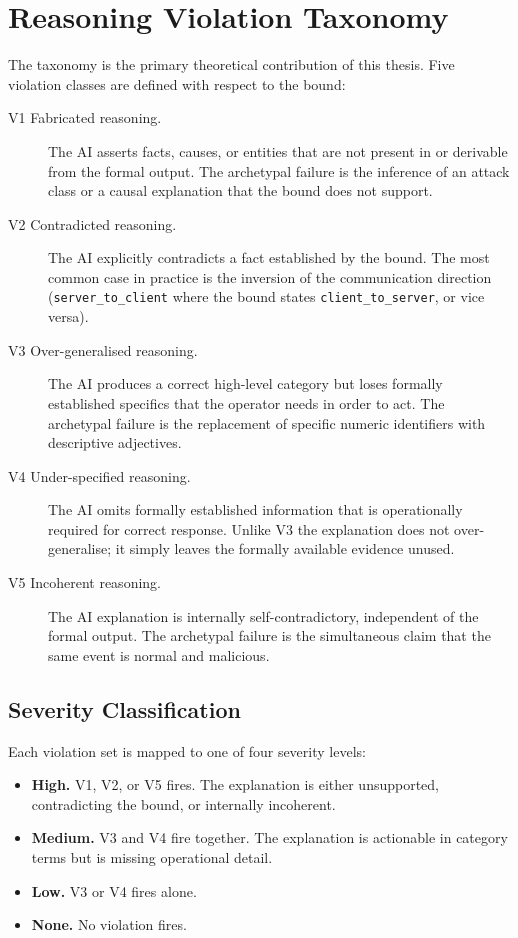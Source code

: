 \section{Reasoning Violation Taxonomy}
\label{sec:taxonomy}

The taxonomy is the primary theoretical contribution of this thesis. Five
violation classes are defined with respect to the bound:

\begin{description}
  \item[V1 Fabricated reasoning.] The AI asserts facts, causes, or entities
        that are not present in or derivable from the formal output. The
        archetypal failure is the inference of an attack class or a causal
        explanation that the bound does not support.
  \item[V2 Contradicted reasoning.] The AI explicitly contradicts a fact
        established by the bound. The most common case in practice is the
        inversion of the communication direction
        (\texttt{server\_to\_client} where the bound states
        \texttt{client\_to\_server}, or vice versa).
  \item[V3 Over-generalised reasoning.] The AI produces a correct
        high-level category but loses formally established specifics that
        the operator needs in order to act. The archetypal failure is the
        replacement of specific numeric identifiers with descriptive
        adjectives.
  \item[V4 Under-specified reasoning.] The AI omits formally established
        information that is operationally required for correct response.
        Unlike V3 the explanation does not over-generalise; it simply leaves
        the formally available evidence unused.
  \item[V5 Incoherent reasoning.] The AI explanation is internally
        self-contradictory, independent of the formal output. The
        archetypal failure is the simultaneous claim that the same event is
        normal and malicious.
\end{description}

\subsection{Severity Classification}
\label{subsec:severity}

Each violation set is mapped to one of four severity levels:

\begin{itemize}
  \item \textbf{High.} V1, V2, or V5 fires. The explanation is either
        unsupported, contradicting the bound, or internally incoherent.
  \item \textbf{Medium.} V3 and V4 fire together. The explanation is
        actionable in category terms but is missing operational detail.
  \item \textbf{Low.} V3 or V4 fires alone.
  \item \textbf{None.} No violation fires.
\end{itemize}


